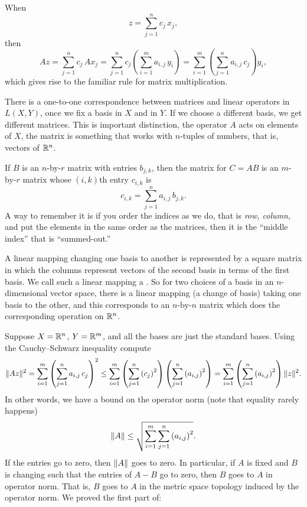 When
\begin{equation*}
z = \sum_{j=1}^n c_j \, x_j ,
\end{equation*}
then
\begin{equation*}
A z =
\sum_{j=1}^n c_j \, A x_j 
=
\sum_{j=1}^n c_j \left( \sum_{i=1}^m  a_{i,j}\, y_i \right) 
=
\sum_{i=1}^m \left(\sum_{j=1}^n  a_{i,j}\, c_j \right) y_i ,
\end{equation*}
which gives rise to the familiar rule for matrix multiplication.

There is a one-to-one correspondence between matrices and linear operators in
$L(X,Y)$, once we fix a basis in $X$ and in $Y$.  If we 
choose a different basis, we get different matrices.  This is
important distinction, the operator $A$ acts on elements of $X$, the matrix
is something that works with $n$-tuples of numbers, that is, vectors of
${\mathbb{R}}^n$.

If $B$ is an $n$-by-$r$ matrix with entries $b_{j,k}$, then 
the matrix for $C = AB$ is an $m$-by-$r$ matrix whose $(i,k)$th entry
$c_{i,k}$ is
\begin{equation*}
c_{i,k} =
\sum_{j=1}^n a_{i,j}\,b_{j,k} .
\end{equation*}
A way to remember it is if you order the indices as we do, that is
\emph{row, column}, and put the elements in the same order as the matrices,
then it is the ``middle index'' that is ``summed-out.''

A linear mapping changing one basis to another is represented by a
square matrix in which the columns represent vectors
of the second basis in terms of the first basis.  We call such a linear
mapping a \emph{}.  So for two choices of a
basis in an $n$-dimensional vector space, there is a linear mapping
(a change of basis)
taking one basis to the other, and this corresponds to an $n$-by-$n$
matrix which does the corresponding operation on ${\mathbb{R}}^n$.

\medskip

Suppose
$X={\mathbb{R}}^n$, $Y={\mathbb{R}}^m$, and
all the bases are just the standard bases.
Using the Cauchy--Schwarz inequality compute
\begin{equation*}
\lVert {Az} \rVert^2
=
\sum_{i=1}^m { \left(\sum_{j=1}^n a_{i,j} \, c_j \right)}^2
\leq
\sum_{i=1}^m { \left(\sum_{j=1}^n {(c_j)}^2 \right) \left(\sum_{j=1}^n
{(a_{i,j})}^2 \right) }
=
\sum_{i=1}^m \left(\sum_{j=1}^n {(a_{i,j})}^2 \right)
\lVert {z} \rVert^2 .
\end{equation*}
In other words, we have a bound on the operator norm (note that equality
rarely happens)
\begin{equation*}
\lVert {A} \rVert \leq
\sqrt{\sum_{i=1}^m \sum_{j=1}^n {(a_{i,j})}^2} .
\end{equation*}
If the entries go to zero, then $\lVert {A} \rVert$ goes to zero.  In
particular, if $A$ is fixed and $B$ is changing such
that the entries of $A-B$ go to zero, then $B$ goes to $A$
in operator norm.  That is, $B$ goes to $A$
in the metric space topology induced by the
operator norm.  We proved the first part of:

